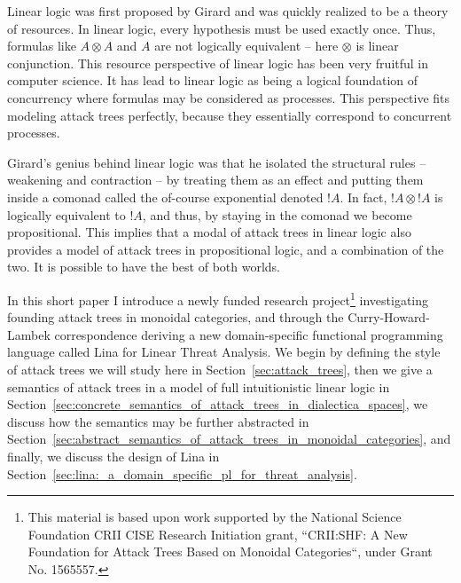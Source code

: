 \documentclass{llncs}
\begin{document}
Linear logic was first proposed by Girard \cite{?} and was quickly
realized to be a theory of resources.  In linear logic, every
hypothesis must be used exactly once.  Thus, formulas like $A \otimes
A$ and $A$ are not logically equivalent -- here $\otimes$ is linear
conjunction.  This resource perspective of linear logic has been very
fruitful in computer science.  It has lead to linear logic as being a
logical foundation of concurrency \cite{?} where formulas may be
considered as processes.  This perspective fits modeling attack trees
perfectly, because they essentially correspond to concurrent
processes.

Girard's genius behind linear logic was that he isolated the
structural rules -- weakening and contraction -- by treating them as
an effect and putting them inside a comonad called the of-course
exponential denoted $!A$.  In fact, $!A \otimes !A$ is logically
equivalent to $!A$, and thus, by staying in the comonad we become
propositional.  This implies that a modal of attack trees in linear
logic also provides a model of attack trees in propositional logic,
and a combination of the two.  It is possible to have the best of both
worlds.

In this short paper I introduce a newly funded research
project\footnote{This material is based upon work supported by the
  National Science Foundation CRII CISE Research Initiation grant,
  ``CRII:SHF: A New Foundation for Attack Trees Based on Monoidal
  Categories``, under Grant No. 1565557.}  investigating founding
attack trees in monoidal categories, and through the
Curry-Howard-Lambek correspondence deriving a new domain-specific
functional programming language called Lina for Linear Threat
Analysis.  We begin by defining the style of attack trees we will
study here in Section~\ref{sec:attack_trees}, then we give a semantics
of attack trees in a model of full intuitionistic linear logic in
Section~\ref{sec:concrete_semantics_of_attack_trees_in_dialectica_spaces},
we discuss how the semantics may be further abstracted in
Section~\ref{sec:abstract_semantics_of_attack_trees_in_monoidal_categories},
and finally, we discuss the design of Lina in
Section~\ref{sec:lina:_a_domain_specific_pl_for_threat_analysis}.
\end{document}

